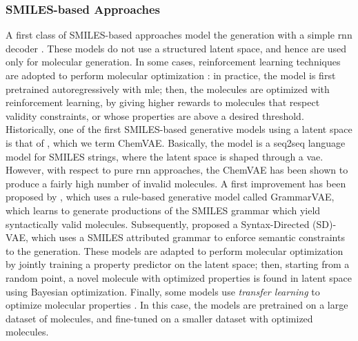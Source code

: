 \subsubsection*{SMILES-based Approaches}
A first class of SMILES-based approaches model the generation with a simple \gls{rnn} decoder \citep{segler2017moleculelibrariesrnn,bjerrum2017molecularrnn}. These models do not use a structured latent space, and hence are used only for molecular generation. In some cases, reinforcement learning techniques are adopted to perform molecular optimization \citep{olivecrona2017deepreinforcementlearningmolecules,neil2018rnnmolecule}: in practice, the model is first pretrained autoregressively with \gls{mle}; then, the molecules are optimized with reinforcement learning, by giving higher rewards to molecules that respect validity constraints, or whose properties are above a desired threshold. Historically, one of the first SMILES-based generative models using a latent space is that of \citet{gomez2018vaemolecule}, which we term ChemVAE. Basically, the model is a seq2seq language model for SMILES strings, where the latent space is shaped through a \gls{vae}. However, with respect to pure \gls{rnn} approaches, the ChemVAE has been shown to produce a fairly high number of invalid molecules. A first improvement has been proposed by \citet{kusner2017grammarvae}, which uses a rule-based generative model called GrammarVAE, which learns to generate productions of the SMILES grammar which yield syntactically valid molecules. Subsequently, \citet{dai2018sdvae} proposed a Syntax-Directed (SD)-VAE, which uses a SMILES attributed grammar to enforce semantic constraints to the generation. These models are adapted to perform molecular optimization by jointly training a property predictor on the latent space; then, starting from a random point, a novel molecule with optimized properties is found in latent space using Bayesian optimization. Finally, some models use \emph{transfer learning} to optimize molecular properties \citep{maragakis2020desmiles,grisoni2018transferlearningmolecules}. In this case, the models are pretrained on a large dataset of molecules, and fine-tuned on a smaller dataset with optimized molecules.

